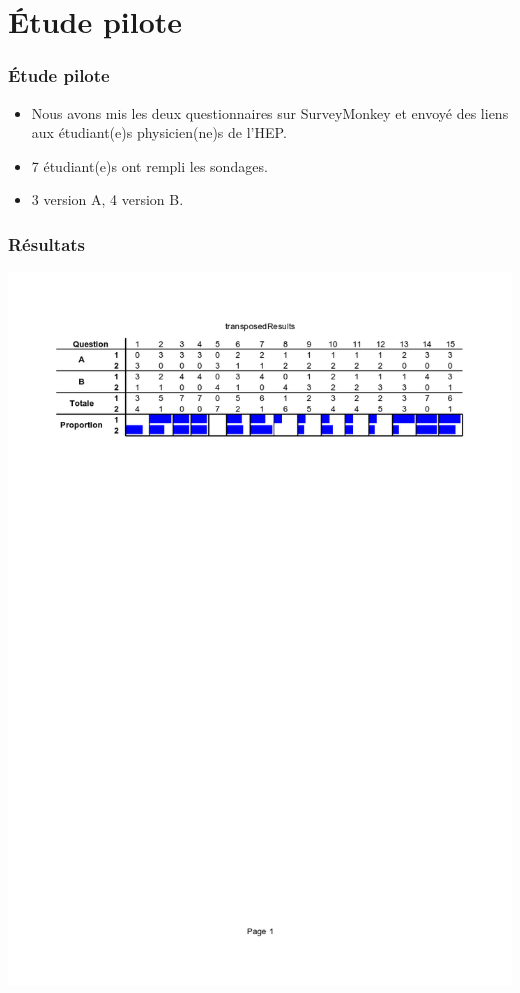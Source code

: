 \documentclass{beamer}
\begin{document}
\section{Étude pilote}
\begin{frame}
\frametitle{Étude pilote}
  \begin{itemize}
  \item Nous avons mis les deux questionnaires sur SurveyMonkey et envoyé des liens aux étudiant(e)s
  physicien(ne)s de l'HEP.
  \item 7 étudiant(e)s ont rempli les sondages.
    \item 3 version A, 4 version B.
    \end{itemize}

\end{frame}

\begin{frame}
  \frametitle{Résultats}

  \begin{center}
\hspace*{-1.5cm}\includegraphics[scale=0.5]{transposedResults}%
\end{center}
  \end{frame}
\end{document}
